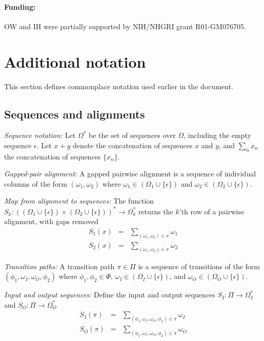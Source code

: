 \documentclass{article}
\newcommand\gappedalphabet[1]{(\Omega_{#1} \cup \{\epsilon\})}
\newcommand\gappedpair[2]{\gappedalphabet{#1} \times \gappedalphabet{#2}}
\newcommand\States{\Phi}
\begin{document}
\paragraph{Funding:} OW and IH were partially supported by NIH/NHGRI grant R01-GM076705.

\appendix
\section{Additional notation}
This section defines commonplace notation used earlier in the document.
\subsection{Sequences and alignments}
{\em Sequence notation:}
Let $\Omega^\ast$ be the set of sequences over $\Omega$, including the empty sequence $\epsilon$.
Let $x+y$ denote the concatenation of sequences $x$ and $y$, and $\sum_n x_n$ the concatenation of sequences $\{ x_n \}$.

{\em Gapped-pair alignment:}
A gapped pairwise alignment is a sequence of individual columns of the form $(\omega_1,\omega_2)$ where $\omega_1 \in \gappedalphabet{1}$ and $\omega_2 \in \gappedalphabet{2}$.

{\em Map from alignment to sequences:}
The function $S_k:\left(\gappedpair{1}{2}\right)^\ast \to \Omega_k^\ast$ returns the $k$'th row of a pairwise alignment, with gaps removed
\begin{eqnarray*}
S_1(x) & = & \sum_{(\omega_1,\omega_2) \in x} \omega_1 \\
S_2(x) & = & \sum_{(\omega_1,\omega_2) \in x} \omega_2
\end{eqnarray*}

{\em Transition paths:}
A transition path $\pi \in \Pi$ 
is a sequence of transitions of the form $(\phi_1,\omega_I,\omega_O,\phi_2)$
where
$\phi_1,\phi_2 \in \States$,
$\omega_I \in \gappedalphabet{I}$, and
$\omega_O \in \gappedalphabet{O}$.

{\em Input and output sequences:}
Define the input and output sequences
$S_I:\Pi \to \Omega_I^\ast$ and
$S_O:\Pi \to \Omega_O^\ast$
\begin{eqnarray*}
S_I(\pi) & = & \sum_{(\phi_1,\omega_I,\omega_O,\phi_2) \in \pi} \omega_I \\
S_O(\pi) & = & \sum_{(\phi_1,\omega_I,\omega_O,\phi_2) \in \pi} \omega_O
\end{eqnarray*}




\end{document}
